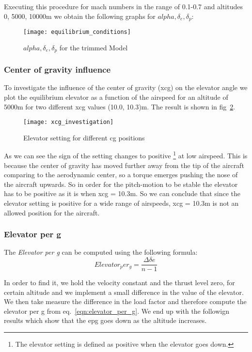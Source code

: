 Executing this procedure for mach numbers in the range of 0.1-0.7 and altitudes
0, 5000, 10000m we obtain the following graphs for $alpha, \delta_e,\delta_p$:

\begin{figure}[H]
    \centering
    \texttt{[image: equilibrium\_conditions]}
    \caption{$alpha, \delta_e,\delta_p$ for the trimmed Model}
\label{fig:equilibrium_conditions}
\end{figure}


\subsubsection{Center of gravity influence}
To investigate the influence of the center of gravity (xcg) on the elevator
angle we plot the equilibrium elevator as a function of the airspeed for
an altitude of 5000m  for two different xcg values (10.0, 10.3)m. 
The result is shown in fig~\ref{fig:xcg_investigation}.

\begin{figure}[H]
    \centering
    \texttt{[image: xcg\_investigation]}
    \caption{Elevator setting for different cg positions}
    \label{fig:xcg_investigation}
\end{figure}

As we can see the sign of the setting changes to positive
\footnote{The elevator setting is defined as positive when the elevator goes
down.} at low airspeed. This is because the center of gravity has moved further
away from the tip of the aircraft comparing to the aerodynamic center, so a
torque emerges pushing the nose of the aircraft upwards. So in order for the
pitch-motion to be stable the elevator has to be positive as it is when xcg =
10.3m. So we can conclude that since the elevator setting is positive for a wide
range of airspeeds, xcg = 10.3m is not an allowed position for the
aircraft. 

\subsubsection{Elevator per g}
The \textit{Elevator per g} can be computed using the following formula:
\begin{equation}
    Elevator_per_g = \frac{\Delta \delta e}{n-1}
    \label{eqn:elevator_per_g}
\end{equation}

In order to find it, we hold the velocity constant and the thrust level zero,
for certain altitude and we implement a small difference in the value of the
elevator. We then take measure the difference in the load factor and therefore
compute the elevator per g from eq.~\ref{eqn:elevator_per_g}.  We end up with
the followign results which show that the epg goes down as the altitude
increases.

